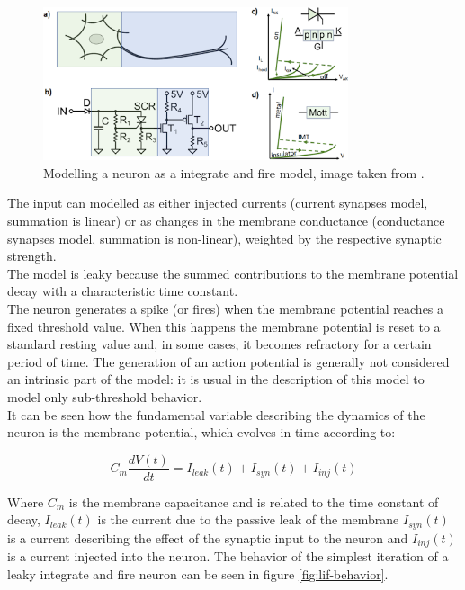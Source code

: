   \begin{figure}
    \centering
    \includegraphics[width=0.8\textwidth]{lif-schema}
    \caption{Modelling a neuron as a integrate and fire model, image taken from \cite{lif-schema}.}
    \label{fig:lif-circuit}
  \end{figure}

  The input can modelled as either injected currents (current synapses model, summation is linear) or as changes in the membrane conductance (conductance synapses model, summation is non-linear),  weighted by the respective synaptic strength.\\
  The model is leaky because the summed contributions to the membrane potential decay with a characteristic time constant.\\
  The neuron generates a spike (or fires) when the membrane potential reaches a fixed threshold value.
  When this happens the membrane potential is reset to a standard resting value and, in some cases, it becomes refractory for a certain period of time.
  The generation of an action potential is generally not considered an intrinsic part of the model: it is usual in the description of this model to model only sub-threshold behavior.\\
  It can be seen how the fundamental variable describing the dynamics of the neuron is the membrane potential, which evolves in time according to:

  \begin{equation}
    C_m\frac{dV(t)}{dt} = I_{leak}(t) + I_{syn}(t) + I_{inj}(t)
    \label{eq:lif-membrane-potential}
  \end{equation}

  Where $C_m$ is the membrane capacitance and is related to the time constant of decay, $I_{leak}(t)$ is the current due to the passive leak of the membrane $I_{syn}(t)$ is a current describing the effect of the synaptic input to the neuron and $I_{inj}(t)$ is a current injected into the neuron.
  The behavior of the simplest iteration of a leaky integrate and fire neuron can be seen in figure \ref{fig:lif-behavior}.

